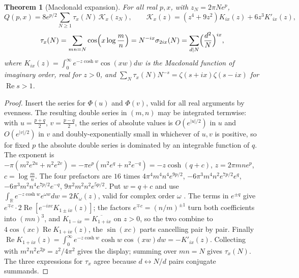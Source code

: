 \documentclass[11pt]{article}
\newtheorem{theorem}{Theorem}[section]
\theoremstyle{definition}\newtheorem{definition}[theorem]{Definition}
\theoremstyle{remark}\newtheorem{remark}[theorem]{Remark}
\newcommand{\R}{\mathbb R}\newcommand{\C}{\mathbb C}\newcommand{\N}{\mathbb N}
\renewcommand{\Re}{\operatorname{Re}}\renewcommand{\Im}{\operatorname{Im}}
\begin{document}
\begin{theorem}[Macdonald expansion]\label{thm:macdonald}
For all real $p,x$, with $z_N=2\pi Ne^p$,
\[
Q(p,x)=8e^{p/2}\sum_{N\ge1}\tau_x(N)\,\mathcal K_x(z_N),\qquad \mathcal K_x(z)=(z^4+9z^2)K_{ix}(z)+6z^3K'_{ix}(z),
\]
\[
\tau_x(N)=\sum_{mn=N}\cos\Bigl(x\log\frac mn\Bigr)=N^{-ix}\sigma_{2ix}(N)=\sum_{d\mid N}\Bigl(\frac{d^2}{N}\Bigr)^{ix},
\]
where $K_{ix}(z)=\int_0^\infty e^{-z\cosh w}\cos(xw)dw$ is the Macdonald function of imaginary order, real for $z>0$, and $\sum_N\tau_x(N)N^{-s}=\zeta(s+ix)\zeta(s-ix)$ for $\Re s>1$.
\end{theorem}
\begin{proof}
Insert the series for $\Phi(u)$ and $\Phi(v)$, valid for all real arguments by evenness. The resulting double series in $(m,n)$ may be integrated termwise: with $u=\frac{p+q}2$, $v=\frac{p-q}2$, the series of absolute values is $O(e^{|u|/2})$ in $u$ and $O(e^{|v|/2})$ in $v$ and doubly-exponentially small in whichever of $u,v$ is positive, so for fixed $p$ the absolute double series is dominated by an integrable function of $q$. The exponent is $-\pi(m^2e^{2u}+n^2e^{2v})=-\pi e^p(m^2e^q+n^2e^{-q})=-z\cosh(q+c)$, $z=2\pi mne^p$, $c=\log\frac mn$. The four prefactors are $16$ times $4\pi^4m^4n^4e^{9p/2}$, $-6\pi^3m^4n^2e^{7p/2}e^{q}$, $-6\pi^3m^2n^4e^{7p/2}e^{-q}$, $9\pi^2m^2n^2e^{5p/2}$. Put $w=q+c$ and use $\int_\R e^{-z\cosh w}e^{\omega w}dw=2K_\omega(z)$, valid for complex order $\omega$ \cite[10.32.9]{DLMF}. The terms in $e^{\pm q}$ give $e^{\mp c}\cdot2\Re[e^{-ixc}K_{1\pm ix}(z)]$; the factors $e^{\mp c}=(n/m)^{\pm1}$ turn both coefficients into $(mn)^3$, and $K_{1-ix}=\overline{K_{1+ix}}$ on $z>0$, so the two combine to $4\cos(xc)\Re K_{1+ix}(z)$, the $\sin(xc)$ parts cancelling pair by pair. Finally $\Re K_{1+ix}(z)=\int_0^\infty e^{-z\cosh w}\cosh w\cos(xw)dw=-K'_{ix}(z)$. Collecting with $m^2n^2e^{2p}=z^2/4\pi^2$ gives the display; summing over $mn=N$ gives $\tau_x(N)$. The three expressions for $\tau_x$ agree because $d\leftrightarrow N/d$ pairs conjugate summands.
\end{proof}
\end{document}
